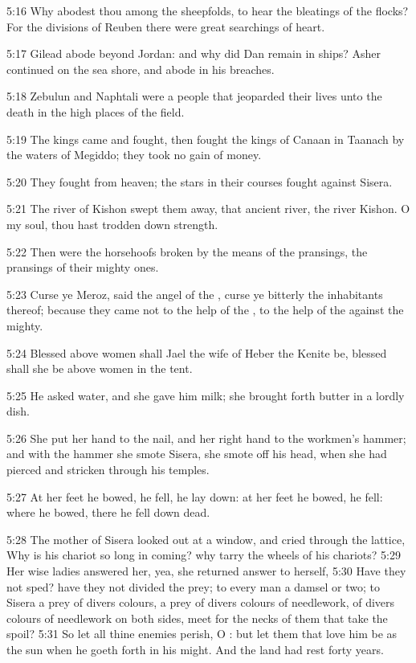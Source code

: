 5:16 Why abodest thou among the sheepfolds, to hear the bleatings of the flocks? For the divisions of Reuben there were great searchings of heart.

5:17 Gilead abode beyond Jordan: and why did Dan remain in ships?  Asher continued on the sea shore, and abode in his breaches.

5:18 Zebulun and Naphtali were a people that jeoparded their lives unto the death in the high places of the field.

5:19 The kings came and fought, then fought the kings of Canaan in Taanach by the waters of Megiddo; they took no gain of money.

5:20 They fought from heaven; the stars in their courses fought against Sisera.

5:21 The river of Kishon swept them away, that ancient river, the river Kishon. O my soul, thou hast trodden down strength.

5:22 Then were the horsehoofs broken by the means of the pransings, the pransings of their mighty ones.

5:23 Curse ye Meroz, said the angel of the \LORD, curse ye bitterly the inhabitants thereof; because they came not to the help of the \LORD, to the help of the \LORD against the mighty.

5:24 Blessed above women shall Jael the wife of Heber the Kenite be, blessed shall she be above women in the tent.

5:25 He asked water, and she gave him milk; she brought forth butter in a lordly dish.

5:26 She put her hand to the nail, and her right hand to the workmen's hammer; and with the hammer she smote Sisera, she smote off his head, when she had pierced and stricken through his temples.

5:27 At her feet he bowed, he fell, he lay down: at her feet he bowed, he fell: where he bowed, there he fell down dead.

5:28 The mother of Sisera looked out at a window, and cried through the lattice, Why is his chariot so long in coming? why tarry the wheels of his chariots?  5:29 Her wise ladies answered her, yea, she returned answer to herself, 5:30 Have they not sped? have they not divided the prey; to every man a damsel or two; to Sisera a prey of divers colours, a prey of divers colours of needlework, of divers colours of needlework on both sides, meet for the necks of them that take the spoil?  5:31 So let all thine enemies perish, O \LORD: but let them that love him be as the sun when he goeth forth in his might. And the land had rest forty years.

